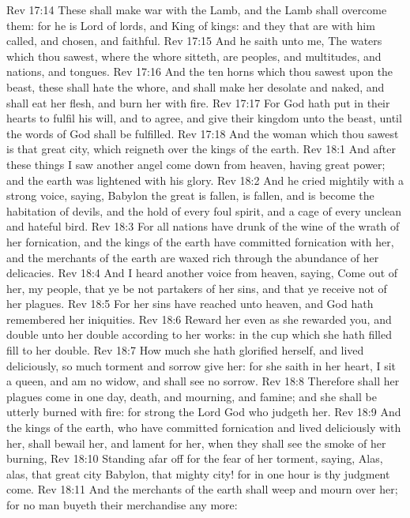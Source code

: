 \vs Rev 17:14 These shall make war with the Lamb, and the Lamb shall overcome them: for he is Lord of lords, and King of kings: and they that are with him  called, and chosen, and faithful.
\vs Rev 17:15 And he saith unto me, The waters which thou sawest, where the whore sitteth, are peoples, and multitudes, and nations, and tongues.
\vs Rev 17:16 And the ten horns which thou sawest upon the beast, these shall hate the whore, and shall make her desolate and naked, and shall eat her flesh, and burn her with fire.
\vs Rev 17:17 For God hath put in their hearts to fulfil his will, and to agree, and give their kingdom unto the beast, until the words of God shall be fulfilled.
\vs Rev 17:18 And the woman which thou sawest is that great city, which reigneth over the kings of the earth.
\vs Rev 18:1 And after these things I saw another angel come down from heaven, having great power; and the earth was lightened with his glory.
\vs Rev 18:2 And he cried mightily with a strong voice, saying, Babylon the great is fallen, is fallen, and is become the habitation of devils, and the hold of every foul spirit, and a cage of every unclean and hateful bird.
\vs Rev 18:3 For all nations have drunk of the wine of the wrath of her fornication, and the kings of the earth have committed fornication with her, and the merchants of the earth are waxed rich through the abundance of her delicacies.
\vs Rev 18:4 And I heard another voice from heaven, saying, Come out of her, my people, that ye be not partakers of her sins, and that ye receive not of her plagues.
\vs Rev 18:5 For her sins have reached unto heaven, and God hath remembered her iniquities.
\vs Rev 18:6 Reward her even as she rewarded you, and double unto her double according to her works: in the cup which she hath filled fill to her double.
\vs Rev 18:7 How much she hath glorified herself, and lived deliciously, so much torment and sorrow give her: for she saith in her heart, I sit a queen, and am no widow, and shall see no sorrow.
\vs Rev 18:8 Therefore shall her plagues come in one day, death, and mourning, and famine; and she shall be utterly burned with fire: for strong  the Lord God who judgeth her.
\vs Rev 18:9 And the kings of the earth, who have committed fornication and lived deliciously with her, shall bewail her, and lament for her, when they shall see the smoke of her burning,
\vs Rev 18:10 Standing afar off for the fear of her torment, saying, Alas, alas, that great city Babylon, that mighty city! for in one hour is thy judgment come.
\vs Rev 18:11 And the merchants of the earth shall weep and mourn over her; for no man buyeth their merchandise any more:
